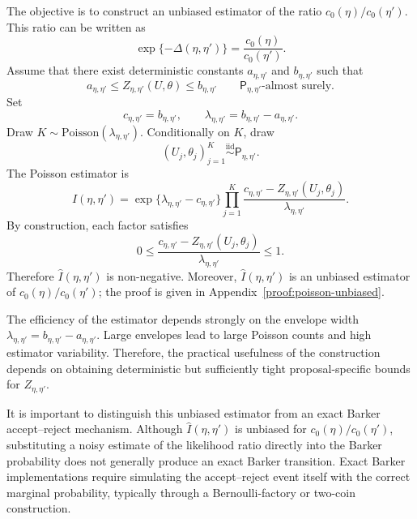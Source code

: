 The objective is to construct an unbiased estimator of the ratio $c_0(\eta)/c_0(\eta')$.
This ratio can be written as
\begin{equation}
    \exp\{-\Delta(\eta,\eta')\}
    =
    \frac{c_0(\eta)}{c_0(\eta')}.
\end{equation}
Assume that there exist deterministic constants $a_{\eta,\eta'}$ and $b_{\eta,\eta'}$ such that
\begin{equation}
    a_{\eta,\eta'}
    \le
    Z_{\eta,\eta'}(U,\theta)
    \le
    b_{\eta,\eta'}
    \qquad
    \mathsf P_{\eta,\eta'}\text{-almost surely}.
\end{equation}
Set
\begin{equation}
    c_{\eta,\eta'}
    =
    b_{\eta,\eta'},
    \qquad
    \lambda_{\eta,\eta'}
    =
    b_{\eta,\eta'}-a_{\eta,\eta'}.
\end{equation}
Draw $K\sim\mathrm{Poisson}(\lambda_{\eta,\eta'})$.
Conditionally on $K$, draw
\begin{equation}
    (U_j,\theta_j)_{j=1}^K
    \overset{\mathrm{iid}}{\sim}
    \mathsf P_{\eta,\eta'}.
\end{equation}
The Poisson estimator is
\begin{equation}
    \widehat I(\eta,\eta')
    =
    \exp\{\lambda_{\eta,\eta'}-c_{\eta,\eta'}\}
    \prod_{j=1}^{K}
    \frac{
        c_{\eta,\eta'} -
        Z_{\eta,\eta'}(U_j,\theta_j)
    }{
        \lambda_{\eta,\eta'}
    }.
    \label{eq:poisson-estimator}
\end{equation}
By construction, each factor satisfies
\begin{equation}
    0
    \le
    \frac{
        c_{\eta,\eta'} -
        Z_{\eta,\eta'}(U_j,\theta_j)
    }{
        \lambda_{\eta,\eta'}
    }
    \le
    1.
\end{equation}
Therefore $\widehat I(\eta,\eta')$ is non-negative.
Moreover, $\widehat I(\eta,\eta')$ is an unbiased estimator of $c_0(\eta)/c_0(\eta')$; the proof is given in Appendix~\ref{proof:poisson-unbiased}.

The efficiency of the estimator depends strongly on the envelope width $\lambda_{\eta,\eta'}=b_{\eta,\eta'}-a_{\eta,\eta'}$.
Large envelopes lead to large Poisson counts and high estimator variability.
Therefore, the practical usefulness of the construction depends on obtaining deterministic but sufficiently tight proposal-specific bounds for $Z_{\eta,\eta'}$.

It is important to distinguish this unbiased estimator from an exact Barker accept--reject mechanism.
Although $\widehat I(\eta,\eta')$ is unbiased for $c_0(\eta)/c_0(\eta')$, substituting a noisy estimate of the likelihood ratio directly into the Barker probability does not generally produce an exact Barker transition.
Exact Barker implementations require simulating the accept--reject event itself with the correct marginal probability, typically through a Bernoulli-factory or two-coin construction.

